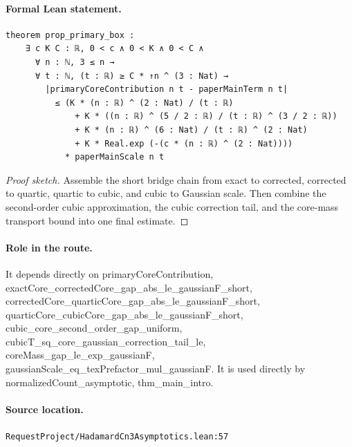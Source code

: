 \medskip
\paragraph{Formal Lean statement.}
\begin{verbatim}
theorem prop_primary_box :
    ∃ c K C : ℝ, 0 < c ∧ 0 < K ∧ 0 < C ∧
      ∀ n : ℕ, 3 ≤ n →
      ∀ t : ℕ, (t : ℝ) ≥ C * ↑n ^ (3 : Nat) →
        |primaryCoreContribution n t - paperMainTerm n t|
          ≤ (K * (n : ℝ) ^ (2 : Nat) / (t : ℝ)
              + K * ((n : ℝ) ^ (5 / 2 : ℝ) / (t : ℝ) ^ (3 / 2 : ℝ))
              + K * (n : ℝ) ^ (6 : Nat) / (t : ℝ) ^ (2 : Nat)
              + K * Real.exp (-(c * (n : ℝ) ^ (2 : Nat))))
            * paperMainScale n t
\end{verbatim}
\begin{proof}[Proof sketch]
Assemble the short bridge chain from exact to corrected, corrected to quartic, quartic to cubic, and cubic to Gaussian scale. Then combine the second-order cubic approximation, the cubic correction tail, and the core-mass transport bound into one final estimate.
\end{proof}
\paragraph{Role in the route.}
It depends directly on primaryCoreContribution, exactCore\_correctedCore\_gap\_abs\_le\_gaussianF\_short, correctedCore\_quarticCore\_gap\_abs\_le\_gaussianF\_short, quarticCore\_cubicCore\_gap\_abs\_le\_gaussianF\_short, cubic\_core\_second\_order\_gap\_uniform, cubicT\_sq\_core\_gaussian\_correction\_tail\_le, coreMass\_gap\_le\_exp\_gaussianF, gaussianScale\_eq\_texPrefactor\_mul\_gaussianF. It is used directly by normalizedCount\_asymptotic, thm\_main\_intro.
\paragraph{Source location.}
\texttt{RequestProject/HadamardCn3Asymptotics.lean:57}
\medskip

